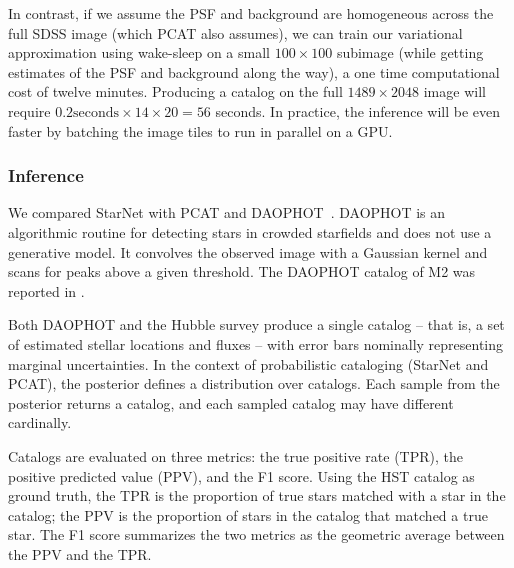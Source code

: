 In contrast, if we assume the PSF and background are homogeneous 
across the full SDSS image (which PCAT also assumes), we can 
train our variational approximation using wake-sleep 
on a small $100 \times 100$ subimage
(while getting estimates of the PSF and background along the way),
a one time computational cost of twelve minutes. 
Producing a catalog on the full $1489 \times 2048$ image will require 
$0.2\text{seconds} \times 14 \times 20 = 56$ seconds. In practice, 
the inference will be even faster by batching the image tiles to run in parallel on a GPU. 



\subsubsection{Inference}
\label{sec:results_on_m2_inference}
We compared StarNet with PCAT and DAOPHOT~\cite{stetson2987daophot}. 
DAOPHOT is an algorithmic routine for detecting stars in crowded starfields and does not use a generative model. 
It convolves the observed image with a Gaussian kernel and scans for peaks above a given threshold. 
The DAOPHOT catalog of M2 was reported in 
\cite{An_2008_m2}. 

Both DAOPHOT and the Hubble survey produce a single catalog -- that is, a set of estimated stellar locations and fluxes -- with
error bars nominally representing marginal uncertainties.
In the context of probabilistic cataloging (StarNet and PCAT), the posterior 
defines a distribution over catalogs.
Each sample from the posterior returns a catalog, and each 
sampled catalog may have different cardinally. 

Catalogs are evaluated on three metrics: the true positive rate (TPR), the positive predicted value (PPV), and the F1 score. Using the HST catalog as ground truth, the TPR is the proportion of true stars matched with a star in the catalog;
the PPV is the proportion of stars in the catalog that matched a true star. The F1 score summarizes the two metrics as the geometric average between the PPV and the TPR.


